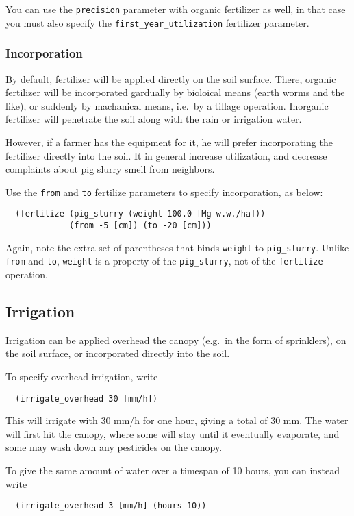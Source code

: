 \documentclass[a4paper,11pt]{article}
\begin{document}
You can use the \texttt{precision} parameter with organic fertilizer
as well, in that case you must also specify the
\texttt{first\_year\_utilization} fertilizer parameter.


\subsubsection{Incorporation}

By default, fertilizer will be applied directly on the soil surface.
There, organic fertilizer will be incorporated gardually by bioloical
means (earth worms and the like), or suddenly by machanical means,
i.e.\ by a tillage operation.  Inorganic fertilizer will penetrate the
soil along with the rain or irrigation water.

However, if a farmer has the equipment for it, he will prefer
incorporating the fertilizer directly into the soil.  It in general
increase utilization, and decrease complaints about pig slurry smell
from neighbors.

Use the \texttt{from} and \texttt{to} fertilize parameters to specify
incorporation, as below:
\begin{verbatim}
  (fertilize (pig_slurry (weight 100.0 [Mg w.w./ha]))
             (from -5 [cm]) (to -20 [cm]))
\end{verbatim}
Again, note the extra set of parentheses that binds \texttt{weight} to
\texttt{pig\_slurry}.  Unlike \texttt{from} and \texttt{to},
\texttt{weight} is a property of the \texttt{pig\_slurry}, not of the
\texttt{fertilize} operation.

\subsection{Irrigation}
\label{sec:irrigation}

Irrigation can be applied overhead the canopy (e.g.\ in the form of
sprinklers), on the soil surface, or incorporated directly into the
soil. 

To specify overhead irrigation, write
\begin{verbatim}
  (irrigate_overhead 30 [mm/h])
\end{verbatim}
This will irrigate with 30 mm/h for one hour, giving a total of 30 mm.
The water will first hit the canopy, where some will stay until it
eventually evaporate, and some may wash down any pesticides on the
canopy.

To give the same amount of water over a timespan of 10 hours, you can
instead write 
\begin{verbatim}
  (irrigate_overhead 3 [mm/h] (hours 10))
\end{verbatim}
\end{document}
